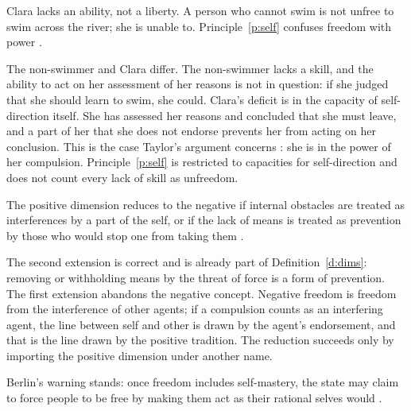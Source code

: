 \documentclass{situationist-preprint}
\begin{document}
\begin{objection}
Clara lacks an ability, not a liberty. A person who cannot swim is not unfree to swim across the river; she is unable to. Principle~\ref{p:self} confuses freedom with power \citep{Steiner1994}.
\end{objection}

\begin{reply}
The non-swimmer and Clara differ. The non-swimmer lacks a skill, and the ability to act on her assessment of her reasons is not in question: if she judged that she should learn to swim, she could. Clara's deficit is in the capacity of self-direction itself. She has assessed her reasons and concluded that she must leave, and a part of her that she does not endorse prevents her from acting on her conclusion. This is the case Taylor's argument concerns \citep{Taylor1979}: she is in the power of her compulsion. Principle~\ref{p:self} is restricted to capacities for self-direction and does not count every lack of skill as unfreedom.
\end{reply}

\begin{objection}
The positive dimension reduces to the negative if internal obstacles are treated as interferences by a part of the self, or if the lack of means is treated as prevention by those who would stop one from taking them \citep{Carter1999}.
\end{objection}

\begin{reply}
The second extension is correct and is already part of Definition~\ref{d:dims}: removing or withholding means by the threat of force is a form of prevention. The first extension abandons the negative concept. Negative freedom is freedom from the interference of other agents; if a compulsion counts as an interfering agent, the line between self and other is drawn by the agent's endorsement, and that is the line drawn by the positive tradition. The reduction succeeds only by importing the positive dimension under another name.
\end{reply}

\begin{objection}
Berlin's warning stands: once freedom includes self-mastery, the state may claim to force people to be free by making them act as their rational selves would \citep{Berlin1958}.
\end{objection}
\end{document}
